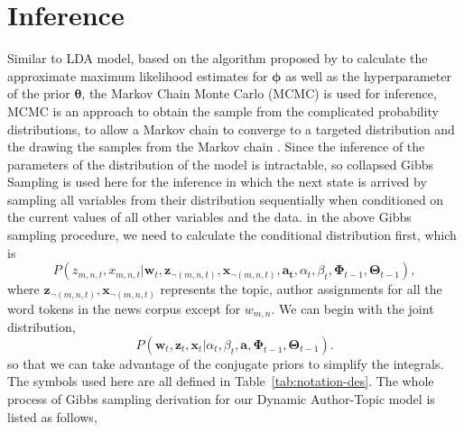 \section{Inference}\label{inferenceofthemodel}

Similar to LDA model, based on the algorithm proposed by \cite{blei2003latent} to calculate the approximate maximum likelihood estimates for $\boldsymbol{\phi}$ as well as the hyperparameter of the prior $\boldsymbol{\theta}$, the Markov Chain Monte Carlo (MCMC) is used for inference, MCMC is an approach to obtain the sample from the complicated probability distributions, to allow a Markov chain to converge to a targeted distribution and the drawing the samples from the Markov chain \cite{gilks1996introducing}. Since the inference of the parameters of the distribution of the model is intractable, so collapsed Gibbs Sampling is used here for the inference in which the next state is arrived by sampling all variables from their distribution sequentially when conditioned on the current values of all other variables and the data.
in the above Gibbs sampling procedure, we need to calculate the conditional distribution first, which is
\begin{equation}
P({z}_{m, n, t},{x}_{m, n, t}| \mathbf{w}_t,\mathbf{z}_{\neg(m, n, t)}, \mathbf{x}_{\neg(m, n, t)},\mathbf{a_t},\alpha_t, \beta_t,\boldsymbol{\Phi}_{t-1}, \boldsymbol{\Theta}_{t-1}),
\label{eq:conditional}
\end{equation}
where $\mathbf{z}_{\neg(m, n, t)}, \mathbf{x}_{\neg(m, n, t)}$ represents the topic, author assignments for all the word tokens in the news corpus except for $w_{m,n}$. We can begin with the joint distribution,
\begin{equation}
P(\mathbf{w}_t, \mathbf{z}_t ,\mathbf{x}_t| \alpha_t, \beta_t,\mathbf{a}, \boldsymbol{\Phi}_{t-1}, \boldsymbol{\Theta}_{t-1}).
\end{equation}
so that we can take advantage of the conjugate priors to simplify the integrals. The symbols used here are all defined in Table~\ref{tab:notation-des}. The whole process of Gibbs sampling derivation for our Dynamic Author-Topic model is listed as follows,
